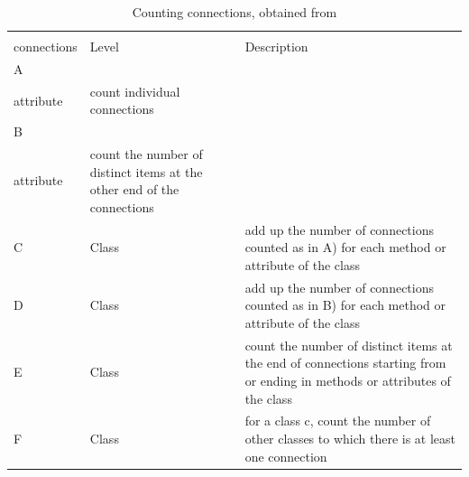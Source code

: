 \begin{table}[htb!]
    \begin{center}
    \begin{tabularx}{\textwidth}{|l|l|X|}
    \hline
    \begin{tabular}[c]{@{}l@{}}Counting\\ connections\end{tabular} & Level & Description \\
    \hline\hline
    A   & \begin{tabular}[c]{@{}l@{}}Method or\\ attribute\end{tabular} & count individual connections  \\
     \hline
    B   & \begin{tabular}[c]{@{}l@{}}Method or\\ attribute\end{tabular} & count the number of distinct items at the other end of the connections  \\
     \hline
    C   & Class & add up the number of connections counted as in A) for each method or attribute of the class   \\
     \hline
    D   & Class & add up the number of connections counted as in B) for each method or attribute of the class   \\
     \hline
    E   & Class & count the number of distinct items at the end of connections starting from or ending in methods or attributes of the class    \\
     \hline
    F   & Class & for a class c, count the number of other classes to which there is at least  one connection  \\
    \hline
    \end{tabularx}
    \end{center}
    \caption{Counting connections, obtained from \cite{briand1999unified}}
    \label{table:counting-connections}
\end{table}

